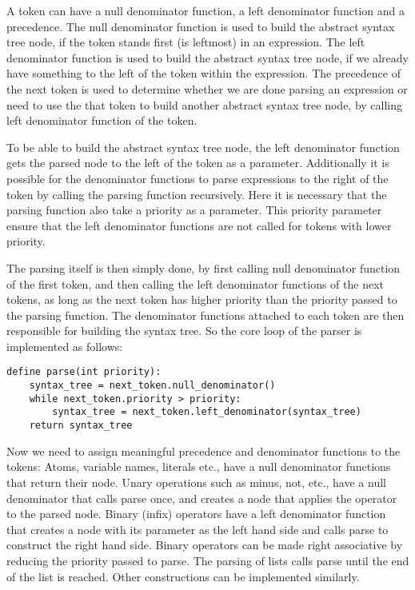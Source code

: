\documentclass[11pt]{report}
\begin{document}
A token can have a null denominator function, a left denominator function and a precedence.
The null denominator function is used to build the abstract syntax tree node, if the token stands first (is leftmost) in an expression.
The left denominator function is used to build the abstract syntax tree node, if we already have something to the left of the token within the expression.
The precedence of the next token is used to determine whether we are done parsing an expression or need to use the that token to build another abstract syntax tree node, by calling left denominator function of the token.

To be able to build the abstract syntax tree node, the left denominator function gets the parsed node to the left of the token as a parameter. Additionally it is possible for the denominator functions to parse expressions to the right of the token by calling the parsing function recursively. Here it is necessary that the parsing function also take a priority as a parameter. This priority parameter ensure that the left denominator functions are not called for tokens with lower priority.

The parsing itself is then simply done, by first calling null denominator function of the first token, and then calling the left denominator functions of the next tokens, as long as the next token has higher priority than the priority passed to the parsing function.
The denominator functions attached to each token are then responsible for building the syntax tree.
So the core loop of the parser is implemented as follows:
\begin{verbatim}
define parse(int priority):
    syntax_tree = next_token.null_denominator()
    while next_token.priority > priority:
        syntax_tree = next_token.left_denominator(syntax_tree)
    return syntax_tree
\end{verbatim}

Now we need to assign meaningful precedence and denominator functions to the tokens:
Atoms, variable names, literals etc., have a null denominator functions that return their node. Unary operations such as minus, not, etc., have a null denominator that calls parse once, and creates a node that applies the operator to the parsed node.
Binary (infix) operators have a left denominator function that creates a node with its parameter as the left hand side and calls parse to construct the right hand side. Binary operators can be made right associative by reducing the priority passed to parse.
The parsing of lists calls parse until the end of the list is reached. Other constructions can be implemented similarly. 
\end{document}
